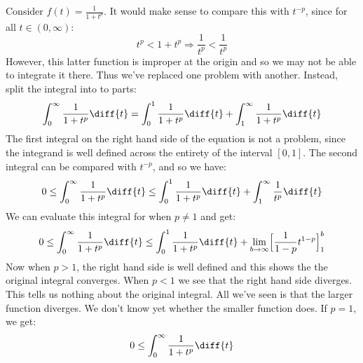 \documentclass[crop=false,class=book,oneside]{standalone}
\begin{document}
        \begin{lexample}
            Consider $f(t)=\frac{1}{1+t^{p}}$. It would make sense
            to compare this with $t^{\minus{p}}$, since for all
            $t\in(0,\infty)$:
            \begin{equation}
                t^{p}<1+t^{p}\Rightarrow
                \frac{1}{t^{p}}<\frac{1}{t^{p}}
            \end{equation}
            However, this latter function is improper at the origin
            and so we may not be able to integrate it there. Thus
            we've replaced one problem with another. Instead, split
            the integral into to parts:
            \begin{equation}
                \int_{0}^{\infty}\frac{1}{1+t^{p}}\diff{t}=
                \int_{0}^{1}\frac{1}{1+t^{p}}\diff{t}+
                \int_{1}^{\infty}\frac{1}{1+t^{p}}\diff{t}
            \end{equation}
            The first integral on the right hand side of the equation
            is not a problem, since the integrand is well defined
            across the entirety of the interval $[0,1]$. The
            second integral can be compared with $t^{\minus{p}}$,
            and so we have:
            \begin{equation}
                0\leq\int_{0}^{\infty}\frac{1}{1+t^{p}}\diff{t}
                \leq\int_{0}^{1}\frac{1}{1+t^{p}}\diff{t}+
                \int_{1}^{\infty}\frac{1}{t^{p}}\diff{t}
            \end{equation}
            We can evaluate this integral for when $p\ne{1}$ and
            get:
            \begin{equation}
                0\leq\int_{0}^{\infty}\frac{1}{1+t^{p}}\diff{t}
                \leq\int_{0}^{1}\frac{1}{1+t^{p}}\diff{t}+
                \underset{b\rightarrow\infty}{\lim}
                \Big[\frac{1}{1-p}t^{1-p}\Big]_{1}^{b}
            \end{equation}
            Now when $p>1$, the right hand side is well defined
            and this shows the the original integral converges.
            When $p<1$ we see that the right hand side diverges.
            This tells us nothing about the original integral. All
            we've seen is that the larger function diverges. We don't
            know yet whether the smaller function does. If $p=1$,
            we get:
            \begin{equation}
                0\leq\int_{0}^{\infty}\frac{1}{1+t^{p}}\diff{t}

\end{equation}
\end{lexample}
\end{document}
